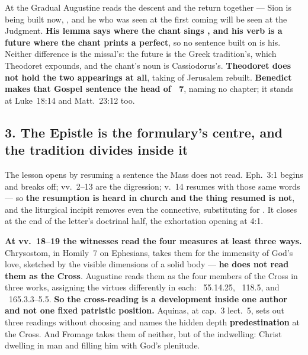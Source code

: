 At the Gradual Augustine reads the descent and the return together --- Sion is
being built now, , and he who was seen at the first
coming  will be seen at the Judgment. \textbf{His
lemma says  where the chant sings ,
and his verb is a future where the chant prints a perfect}, so no sentence built
on  is his. Neither difference is the missal's: the future is
the Greek tradition's, which Theodoret expounds, and the chant's noun is
Cassiodorus's. \textbf{Theodoret does not hold the two appearings at all},
taking  of Jerusalem rebuilt. \textbf{Benedict makes that
Gospel sentence the head of ~7}, naming no chapter; it stands at
Luke~18:14 and Matt.~23:12 too.

\subsection*{3. The Epistle is the formulary's centre, and the tradition divides inside it}

The lesson opens by resuming a sentence the Mass does not read. Eph.~3:1 begins
 and breaks off; vv.~2--13 are the digression; v.~14
resumes with those same words --- so \textbf{the resumption is heard in church
and the thing resumed is not}, and the liturgical incipit removes even the
connective, substituting  for . It closes at the end of the letter's doctrinal half, the exhortation
opening at 4:1.

\textbf{At vv.~18--19 the witnesses read the four measures at least three ways.}
Chrysostom, in Homily~7 on Ephesians, takes them for the immensity of God's
love, sketched by the visible dimensions of a solid body --- \textbf{he does not
read them as the Cross}. Augustine reads them as the four members of the Cross
in three works, assigning the virtues differently in each:
~55.14.25, ~118.5, and
~165.3.3--5.5. \textbf{So the cross-reading is a development inside
one author and not one fixed patristic position.} Aquinas, at  cap.~3 lect.~5, sets out three readings without choosing and names the
hidden depth \textbf{predestination} at the Cross. And Fromage takes them of
neither, but of the indwelling: Christ dwelling in man and filling him with
God's plenitude.

